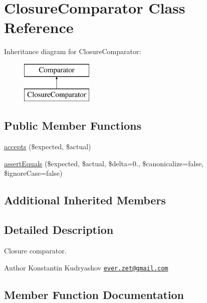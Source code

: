 \hypertarget{class_prophecy_1_1_comparator_1_1_closure_comparator}{}\section{Closure\+Comparator Class Reference}
\label{class_prophecy_1_1_comparator_1_1_closure_comparator}
Inheritance diagram for Closure\+Comparator\+:\begin{figure}[H]
\begin{center}
\leavevmode
\includegraphics[height=2.000000cm]{class_prophecy_1_1_comparator_1_1_closure_comparator}
\end{center}
\end{figure}
\subsection*{Public Member Functions}
\begin{DoxyCompactItemize}
\item 
\mbox{\hyperlink{class_prophecy_1_1_comparator_1_1_closure_comparator_ae9bdf0cba02ce3470169280656cdeb84}{accepts}} (\$expected, \$actual)
\item 
\mbox{\hyperlink{class_prophecy_1_1_comparator_1_1_closure_comparator_adb3679ea06503114394431cb250ec5a4}{assert\+Equals}} (\$expected, \$actual, \$delta=0., \$canonicalize=false, \$ignore\+Case=false)
\end{DoxyCompactItemize}
\subsection*{Additional Inherited Members}


\subsection{Detailed Description}
Closure comparator.

\begin{DoxyAuthor}{Author}
Konstantin Kudryashov \href{mailto:ever.zet@gmail.com}{\tt ever.\+zet@gmail.\+com} 
\end{DoxyAuthor}


\subsection{Member Function Documentation}
\mbox{\label{class_prophecy_1_1_comparator_1_1_closure_comparator_ae9bdf0cba02ce3470169280656cdeb84}} 
